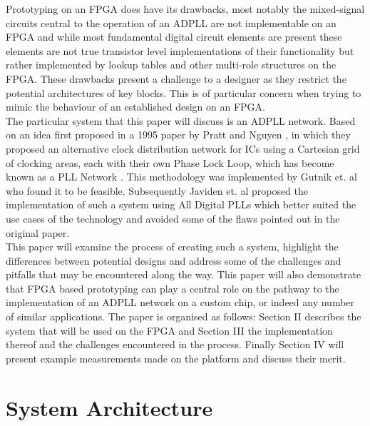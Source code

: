\documentclass[conference]{IEEEtran}
\begin{document}
Prototyping on an FPGA does have its drawbacks, most notably the mixed-signal circuits central to the operation of an ADPLL are not implementable on an FPGA and while most fundamental digital circuit elements are present these elements are not true transistor level implementations of their functionality but rather implemented by lookup tables and other multi-role structures on the FPGA. These drawbacks present a challenge to a designer as they restrict the potential architectures of key blocks. This is of particular concern when trying to mimic the behaviour of an established design on an FPGA.\\
The particular system that this paper will discuss is an ADPLL network. Based on an idea first proposed in a 1995 paper by Pratt and Nguyen \cite{pratt1995distributed}, in which they proposed an alternative clock distribution network for ICs using a Cartesian grid of clocking areas, each with their own Phase Lock Loop, which has become known as a PLL Network . This methodology was implemented by Gutnik et. al \cite{gutnik2000active} who found it to be feasible. Subsequently Javiden et. al
\cite{javidan2011all} proposed the implementation of such a system using All Digital PLLs which better suited the use cases of the technology and avoided some of the flaws pointed out in the original paper.\\
This paper will examine the process of creating such a system, highlight the differences between potential designs and address some of the challenges and pitfalls that may be encountered along the way. This paper will also demonstrate that FPGA based prototyping can play a central role on the pathway to the implementation of an ADPLL network on a custom chip, or indeed any number of similar applications. The paper is organised as follows: Section II describes the system that will be used on the FPGA and Section III the implementation thereof and the challenges encountered in the process. Finally Section IV will present example measurements made on the platform and discuss their merit.

\section{System Architecture}



\newpage
 

\end{document}
